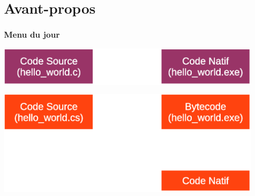 \section*{Avant-propos}

\begin{frame}[c]
    \frametitle{Menu du jour}
    \tableofcontents[pausesections]
\end{frame}

\begin{frame}
  \begin{center}
    \includegraphics[scale=0.65]{img/c-compilation.eps}
  \end{center}
\end{frame}

\begin{frame}[c]
  \begin{center}
    \includegraphics[scale=0.60]{img/csharp-compilation.eps}
  \end{center}
\end{frame}
